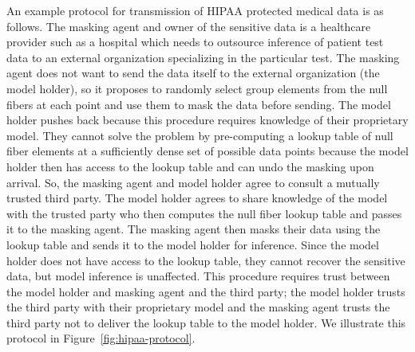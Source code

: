 \documentclass[11pt]{article}
\begin{document}
An example protocol for transmission of HIPAA protected medical data is as follows. The masking agent and owner of the sensitive data is a healthcare provider such as a hospital which needs to outsource inference of patient test data to an external organization specializing in the particular test. The masking agent does not want to send the data itself to the external organization (the model holder), so it proposes to randomly select group elements from the null fibers at each point and use them to mask the data before sending. The model holder pushes back because this procedure requires knowledge of their proprietary model. They cannot solve the problem by pre-computing a lookup table of null fiber elements at a sufficiently dense set of possible data points because the model holder then has access to the lookup table and can undo the masking upon arrival. So, the masking agent and model holder agree to consult a mutually trusted third party. The model holder agrees to share knowledge of the model with the trusted party who then computes the null fiber lookup table and passes it to the masking agent. The masking agent then masks their data using the lookup table and sends it to the model holder for inference. Since the model holder does not have access to the lookup table, they cannot recover the sensitive data, but model inference is unaffected. This procedure requires trust between the model holder and masking agent and the third party; the model holder trusts the third party with their proprietary model and the masking agent trusts the third party not to deliver the lookup table to the model holder. We illustrate this protocol in Figure~\ref{fig:hipaa-protocol}.
\end{document}

